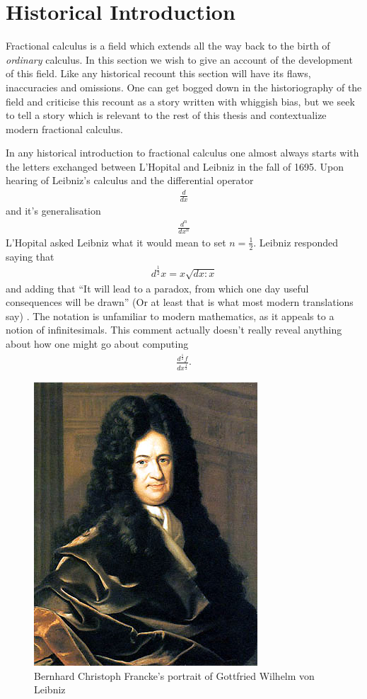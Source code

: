 \section{Historical Introduction}
Fractional calculus is a field which extends all the way back to the birth of \emph{ordinary} calculus. In this section we wish to give an account of the development of this field. Like any historical recount this section will have its flaws, inaccuracies and omissions. One can get bogged down in the historiography of the field and criticise this recount as a story written with whiggish bias, but we seek to tell a story which is relevant to the rest of this thesis and contextualize modern fractional calculus.

In any historical introduction to fractional calculus one almost always starts with the letters exchanged between L'Hopital and Leibniz in the fall of 1695. Upon hearing of Leibniz's calculus and the differential operator
\begin{align*}
    \frac{d}{dx}
\end{align*}
and it's generalisation
\begin{align*}
    \frac{d^n}{dx^n}
\end{align*}
L'Hopital asked Leibniz what it would mean to set $ n = \frac{1}{2} $. Leibniz responded saying that 
\begin{align*}
    d^\frac{1}{2}x = x\sqrt{dx:x}
\end{align*} and adding that
``It will lead to a paradox, from which one day useful consequences will be drawn'' (Or at least that is what most modern translations say) \cite{Abbas2012}. The notation is unfamiliar to modern mathematics, as it appeals to a notion of infinitesimals. This comment actually doesn't really reveal anything about how one might go about computing
\begin{align*}
    \frac{d^\frac{1}{2}f}{dx^\frac{1}{2}}.
\end{align*}

\begin{figure}
    \includegraphics[scale=0.4]{images/Gottfried_Wilhelm_von_Leibniz}
    \caption{Bernhard Christoph Francke's portrait of Gottfried Wilhelm von Leibniz}
\end{figure}


